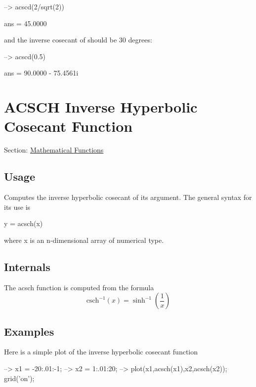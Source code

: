 \begin{DoxyVerbInclude}
--> acscd(2/sqrt(2))

ans = 
   45.0000 
\end{DoxyVerbInclude}


and the inverse cosecant of {} should be 30 degrees\-:


\begin{DoxyVerbInclude}
--> acscd(0.5)

ans = 
  90.0000 - 75.4561i 
\end{DoxyVerbInclude}
 \hypertarget{mathfunctions_acsch}{}\section{A\-C\-S\-C\-H Inverse Hyperbolic Cosecant Function}\label{mathfunctions_acsch}
Section\-: \hyperlink{sec_mathfunctions}{Mathematical Functions} \hypertarget{vtkwidgets_vtkxyplotwidget_Usage}{}\subsection{Usage}\label{vtkwidgets_vtkxyplotwidget_Usage}
Computes the inverse hyperbolic cosecant of its argument. The general syntax for its use is \begin{DoxyVerb}  y = acsch(x)
\end{DoxyVerb}
 where {\ttfamily x} is an {\ttfamily n}-\/dimensional array of numerical type. \hypertarget{transforms_svd_Function}{}\subsection{Internals}\label{transforms_svd_Function}
The {\ttfamily acsch} function is computed from the formula \[ \mathrm{csch}^{-1}(x) = \sinh^{-1}\left(\frac{1}{x}\right) \] \hypertarget{variables_matrix_Examples}{}\subsection{Examples}\label{variables_matrix_Examples}
Here is a simple plot of the inverse hyperbolic cosecant function


\begin{DoxyVerbInclude}
--> x1 = -20:.01:-1;
--> x2 = 1:.01:20;
--> plot(x1,acsch(x1),x2,acsch(x2)); grid('on');
\end{DoxyVerbInclude}


